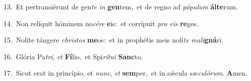 {\numbfont\textcolor{\numbcolor}{13.}}~Et pertransiérunt de gen\textit{te} \textit{in} \textbf{gen}\-tem,~\star et de regno ad \textit{pó}\-\textit{pu}\textit{lum} \textbf{ál}\-\textbf{te}rum.\par
{\numbfont\textcolor{\numbcolor}{14.}}~Non relíquit hóminem no\-\textit{cé}\-\textit{re} \textbf{e}\-is:~\star et corrípuit \textit{pro} \textit{e}\-\textit{is} \textbf{re}\-ges.\par
{\numbfont\textcolor{\numbcolor}{15.}}~Nolíte tángere \textit{chris}\-\textit{tos} \textbf{me}\-os:~\star et in prophétis meis nolí\textit{te} \textit{ma}\-\textit{li}\textbf{gná}ri.\par
{\numbfont\textcolor{\numbcolor}{16.}}~Glória Pa\-\textit{tri}\-, \textit{et} \textbf{Fí}\-lio,~\star et Spi\-\textit{rí}\-\textit{tu}\textit{i} \textbf{Sanc}\-to.\par
{\numbfont\textcolor{\numbcolor}{17.}}~Sicut erat in princípio, et \textit{nunc}\-, \textit{et} \textbf{sem}\-per,~\star et in sǽcula sæ\-\textit{cu}\-\textit{ló}\textit{rum}. \textbf{A}\-men.\par
